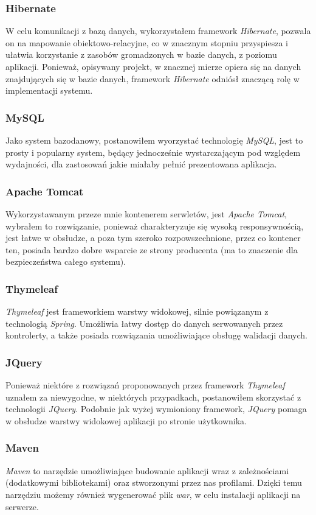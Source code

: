 \documentclass[a4paper, titlepage]{article}
\begin{document}
	\subsubsection{Hibernate}
	W celu komunikacji z bazą danych, wykorzystałem framework \textit{Hibernate}, pozwala on na mapowanie obiektowo-relacyjne, co w znacznym stopniu przyspiesza i ułatwia korzystanie z zasobów gromadzonych w bazie danych, z poziomu aplikacji. Ponieważ, opisywany projekt, w znacznej mierze opiera się na danych znajdujących się w bazie danych, framework \textit{Hibernate} odniósł znaczącą rolę w implementacji systemu. 
	\subsubsection{MySQL}
	Jako system bazodanowy, postanowiłem wyorzystać technologię \textit{MySQL}, jest to prosty i popularny system, będący jednocześnie wystarczającym pod względem wydajności, dla zastosowań jakie miałaby pełnić prezentowana aplikacja.
	\subsubsection{Apache Tomcat}
	Wykorzystawanym przeze mnie kontenerem serwletów, jest \textit{Apache Tomcat}, wybrałem to rozwiązanie, ponieważ charakteryzuje się wysoką responsywnością, jest łatwe w obsłudze, a poza tym szeroko rozpowszechnione, przez co kontener ten, posiada bardzo dobre wsparcie ze strony producenta (ma to znaczenie dla bezpieczeństwa całego systemu).
	\subsubsection{Thymeleaf}
	\textit{Thymeleaf} jest frameworkiem warstwy widokowej, silnie powiązanym z technologią \textit{Spring}. Umożliwia łatwy dostęp do danych serwowanych przez kontrolerty, a także posiada rozwiązania umożliwiające obsługę walidacji danych.
	\subsubsection{JQuery}
	Ponieważ niektóre z rozwiązań proponowanych przez framework \textit{Thymeleaf} uznałem za niewygodne, w niektórych przypadkach, postanowiłem skorzystać z technologii \textit{JQuery}. Podobnie jak wyżej wymioniony framework, \textit{JQuery} pomaga w obsłudze warstwy widokowej aplikacji po stronie użytkownika.
	\subsubsection{Maven}
	\textit{Maven} to narzędzie umożliwiające budowanie aplikacji wraz z zależnościami (dodatkowymi bibliotekami) oraz stworzonymi przez nas profilami. Dzięki temu narzędziu możemy również wygenerować plik \textit{war}, w celu instalacji aplikacji na serwerze.
\end{document}
